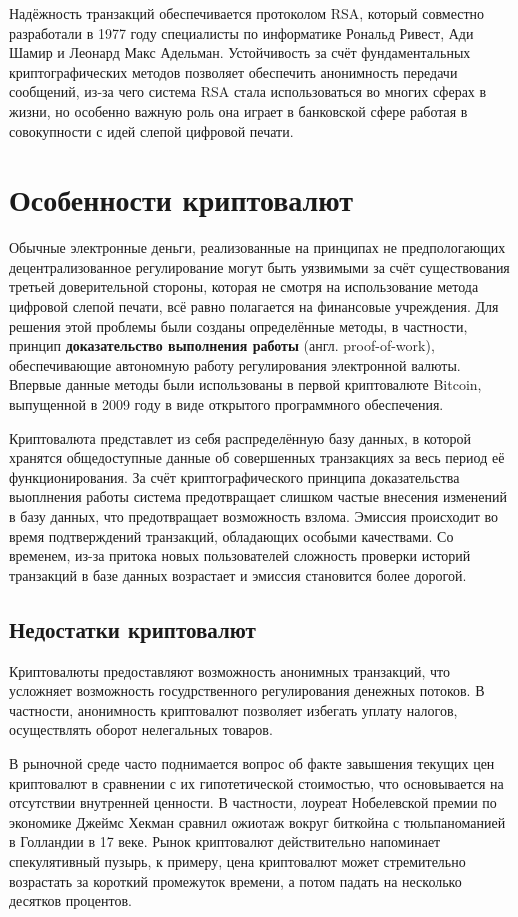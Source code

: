 \documentclass[12pt,a4paper]{article}
\begin{document}
Надёжность транзакций обеспечивается протоколом RSA, который совместно разработали в 1977 году специалисты по информатике Рональд Ривест, Ади Шамир и Леонард Макс Адельман. Устойчивость за счёт фундаментальных криптографических методов позволяет обеспечить анонимность передачи сообщений, из-за чего система RSA стала использоваться во многих сферах в жизни, но особенно важную роль она играет в банковской сфере работая в совокупности с идей слепой цифровой печати.

\section{Особенности криптовалют}

Обычные электронные деньги, реализованные на принципах не предпологающих децентрализованное регулирование могут быть уязвимыми за счёт существования третьей доверительной стороны, которая не смотря на использование метода цифровой слепой печати, всё равно полагается на финансовые учреждения. Для решения этой проблемы были созданы определённые методы, в частности, принцип \textbf{доказательство выполнения работы} (англ. proof-of-work), обеспечивающие автономную работу регулирования электронной валюты. Впервые данные методы были использованы в первой криптовалюте Bitcoin, выпущенной в 2009 году в виде открытого программного обеспечения. 

Криптовалюта представлет из себя распределённую базу данных, в которой хранятся общедоступные данные об совершенных транзакциях за весь период её функционирования. За счёт криптографического принципа доказательства выоплнения работы система предотвращает слишком частые внесения изменений в базу данных, что предотвращает возможность взлома. Эмиссия происходит во время подтверждений транзакций, обладающих особыми качествами. Со временем, из-за притока новых пользователей сложность проверки историй транзакций в базе данных возрастает и эмиссия становится более дорогой.

\subsection{Недостатки криптовалют}

Криптовалюты предоставляют возможность анонимных транзакций, что усложняет возможность госудрственного регулирования денежных потоков. В частности, анонимность криптовалют позволяет избегать уплату налогов, осуществлять оборот нелегальных товаров. 

В рыночной среде часто поднимается вопрос об факте завышения текущих цен криптовалют в сравнении с их гипотетической стоимостью, что основывается на отсутствии внутренней ценности. В частности, лоуреат Нобелевской премии по экономике Джеймс Хекман сравнил ожиотаж вокруг биткойна с тюльпаноманией в Голландии в 17 веке. Рынок криптовалют действительно напоминает спекулятивный пузырь, к примеру, цена криптовалют может стремительно возрастать за короткий промежуток времени, а потом падать на несколько десятков процентов.
\end{document}
